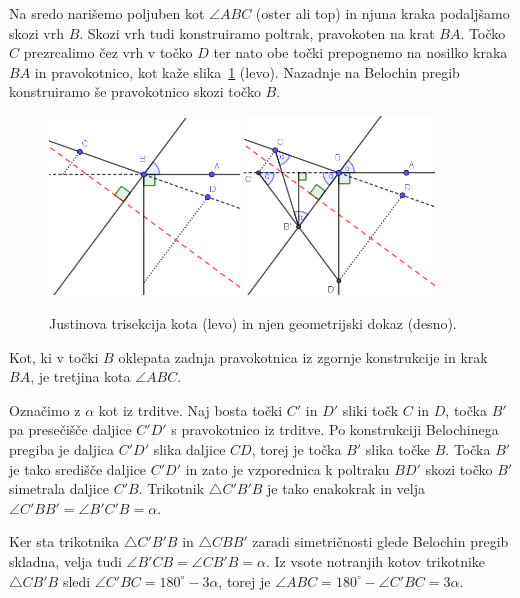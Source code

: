 Na sredo narišemo poljuben kot $\angle ABC$ (oster ali top) in njuna kraka podaljšamo skozi vrh $B$. Skozi vrh tudi konstruiramo poltrak, pravokoten na krat $BA$. Točko $C$ prezrcalimo čez vrh v točko $D$ ter nato obe točki prepognemo na nosilko kraka $BA$ in pravokotnico, kot kaže slika~\ref{fig:justin} (levo). Nazadnje na Belochin pregib konstruiramo še pravokotnico skozi točko $B$.
\begin{figure}[h]
    \centering
    \includegraphics[width=0.45\textwidth]{images/starogr_problemi/justin_trisection.png}
    \includegraphics[width=0.45\textwidth]{images/starogr_problemi/justin_trisection_dokaz.png}
    \caption[Justinova trisekcija kota]{Justinova trisekcija kota (levo) in njen geometrijski dokaz (desno).}
    \label{fig:justin}
\end{figure}

\begin{trditev}
    Kot, ki v točki $B$ oklepata zadnja pravokotnica iz zgornje konstrukcije in krak $BA$, je tretjina kota $\angle ABC$.
\end{trditev}
\begin{dokaz}
    Označimo z $\alpha$ kot iz trditve. Naj bosta točki $C'$ in $D'$ sliki točk $C$ in $D$, točka $B'$ pa presečišče daljice $C'D'$ s pravokotnico iz trditve. Po konstrukciji Belochinega pregiba je daljica $C'D'$ slika daljice $CD$, torej je točka $B'$ slika točke $B$. Točka $B'$ je tako središče daljice $C'D'$ in zato je vzporednica k poltraku $BD'$ skozi točko $B'$ simetrala daljice $C'B$. Trikotnik $\triangle C'B'B$ je tako enakokrak in velja $\angle C'BB' = \angle B'C'B = \alpha$.
    
    Ker sta trikotnika $\triangle C'B'B$ in $\triangle CBB'$ zaradi simetričnosti glede Belochin pregib skladna, velja tudi $\angle B'CB = \angle CB'B = \alpha$. Iz vsote notranjih kotov trikotnike $\triangle CB'B$ sledi $\angle C'BC = 180^\circ - 3\alpha$, torej je $\angle ABC = 180^\circ - \angle C'BC = 3\alpha$. 
\end{dokaz}

